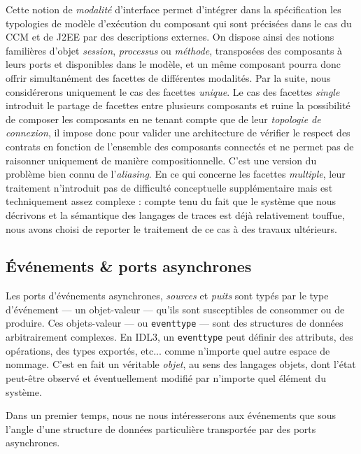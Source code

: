 Cette notion de \emph{modalit\'e} d'interface permet d'int\'egrer dans la
sp\'ecification les typologies de mod\`ele d'ex\'ecution du
composant qui sont pr\'ecis\'ees dans le cas du \textsf{CCM} et
de \textsf{J2EE} par des descriptions externes. On dispose ainsi
des notions famili\`eres d'objet \emph{session}, \emph{processus} ou
\emph{m\'ethode}, transpos\'ees des composants \`a  leurs ports et
disponibles dans le mod\`ele, et un m\^eme composant pourra donc offrir
simultan\'ement des facettes de diff\'erentes modalit\'es. Par la
suite, nous consid\'ererons uniquement le cas des facettes
\emph{unique}. Le cas des facettes \emph{single} introduit le partage de facettes entre
plusieurs composants et ruine la possibilit\'e de composer les
composants en ne tenant compte que de leur \emph{topologie de connexion}, il 
impose donc pour valider une architecture de v\'erifier le respect des
contrats en fonction de l'ensemble des composants connect\'es et ne
permet pas de raisonner uniquement de mani\`ere
compositionnelle. C'est une version du probl\`eme bien connu  
de l'\emph{aliasing}. En ce qui concerne les facettes \emph{multiple},
leur traitement n'introduit pas de difficult\'e conceptuelle
suppl\'ementaire mais est techniquement assez complexe : compte tenu
du fait que le syst\`eme que nous d\'ecrivons et la s\'emantique
des langages de traces est d\'ej\`a relativement touffue, nous avons
choisi de reporter le traitement de ce cas \`a des travaux ult\'erieurs.

\subsection{\'Ev\'enements \& ports asynchrones}

Les ports d'\'ev\'enements asynchrones, \emph{sources} et \emph{puits} sont
typ\'es par le type d'\'ev\'enement --- un objet-valeur --- qu'ils sont
susceptibles de consommer ou de produire. Ces objets-valeur --- ou
\texttt{eventtype} --- sont des structures de donn\'ees arbitrairement
complexes. En \textsf{IDL3}, un \texttt{eventtype} 
peut d\'efinir des attributs, des op\'erations, des types export\'es,
etc... comme n'importe quel autre espace de nommage. C'est en fait un
v\'eritable \emph{objet}, au sens des langages objets, dont l'\'etat
peut-\^etre observ\'e et \'eventuellement modifi\'e par n'importe quel
\'el\'ement du syst\`eme. 

Dans un premier temps, nous ne nous int\'eresserons aux \'ev\'enements que
sous l'angle d'une structure de donn\'ees particuli\`ere transport\'ee par des
ports asynchrones. 

